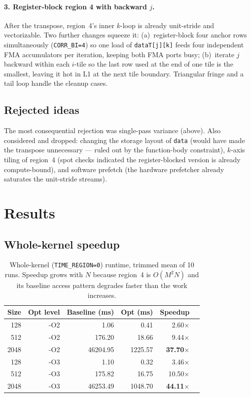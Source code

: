 \documentclass[11pt]{article}
\begin{document}
\paragraph{3. Register-block region 4 with backward $j$.} After the transpose, region~4's inner $k$-loop is already unit-stride and vectorizable. Two further changes squeeze it: (a)~register-block four anchor rows simultaneously (\texttt{CORR\_BI=4}) so one load of \texttt{dataT[j][k]} feeds four independent FMA accumulators per iteration, keeping both FMA ports busy; (b)~iterate $j$ backward within each $i$-tile so the last row used at the end of one tile is the smallest, leaving it hot in L1 at the next tile boundary. Triangular fringe and a tail loop handle the cleanup cases.

\subsection{Rejected ideas}

The most consequential rejection was single-pass variance (above). Also considered and dropped: changing the storage layout of \texttt{data} (would have made the transpose unnecessary --- ruled out by the function-body constraint), $k$-axis tiling of region~4 (spot checks indicated the register-blocked version is already compute-bound), and software prefetch (the hardware prefetcher already saturates the unit-stride streams).


\section{Results}

\subsection{Whole-kernel speedup}

\begin{table}[htp]
\centering
\small
\begin{tabular}{r r r r r r}
\toprule
Size & Opt level & Baseline (ms) & Opt (ms) & Speedup \\
\midrule
128  & -O2 &      1.06 &     0.41 & 2.60$\times$  \\
512  & -O2 &    176.20 &    18.66 & 9.44$\times$  \\
2048 & -O2 &  46204.95 &  1225.57 & \textbf{37.70$\times$} \\
\midrule
128  & -O3 &      1.10 &     0.32 & 3.46$\times$  \\
512  & -O3 &    175.82 &    16.75 & 10.50$\times$ \\
2048 & -O3 &  46253.49 &  1048.70 & \textbf{44.11$\times$} \\
\bottomrule
\end{tabular}
\caption{Whole-kernel (\texttt{TIME\_REGION=0}) runtime, trimmed mean of 10 runs. Speedup grows with $N$ because region~4 is $O(M^2 N)$ and its baseline access pattern degrades faster than the work increases.}
\label{tab:speedup}
\end{table}
\end{document}
